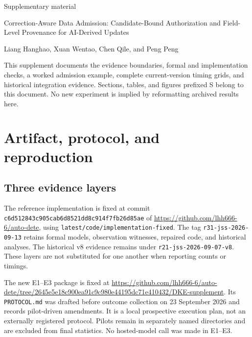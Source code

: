 \documentclass[preprint,12pt,authoryear]{elsarticle}
\newcommand{\code}[1]{\nolinkurl{#1}}
\begin{document}
\begin{center}
{\Large Supplementary material}\par\medskip
{\large Correction-Aware Data Admission: Candidate-Bound Authorization and Field-Level Provenance for AI-Derived Updates}\par\medskip
Liang Hanghao, Xuan Wentao, Chen Qile, and Peng Peng
\par{}
\end{center}

This supplement documents the evidence boundaries, formal and implementation checks, a worked admission example, complete current-version timing grids, and historical integration evidence. Sections, tables, and figures prefixed S belong to this document. No new experiment is implied by reformatting archived results here.

\section{Artifact, protocol, and reproduction}
\label{app:artifact}

\subsection{Three evidence layers}

The reference implementation is fixed at commit \code{c6d512843c905cab6d8521dd8c914f7fb26d85ae} of \url{https://github.com/lhh666-6/auto-dete}, using \code{latest/code/implementation-fixed}. The tag \code{r31-jss-2026-09-13} retains formal models, observation witnesses, repaired code, and historical analyses. The historical v8 evidence remains under \code{r21-jss-2026-09-07-v8}. These layers are not substituted for one another when reporting counts or timings.

The new E1--E3 package is fixed at \url{https://github.com/lhh666-6/auto-dete/tree/2645e5e18c900ea91c9c980e44195dc71e410432/DKE-supplement}. Its \code{PROTOCOL.md} was drafted before outcome collection on 23 September 2026 and records pilot-driven amendments. It is a local prospective execution plan, not an externally registered protocol. Pilots remain in separately named directories and are excluded from final statistics. No hosted-model call was made in E1--E3.
\end{document}
